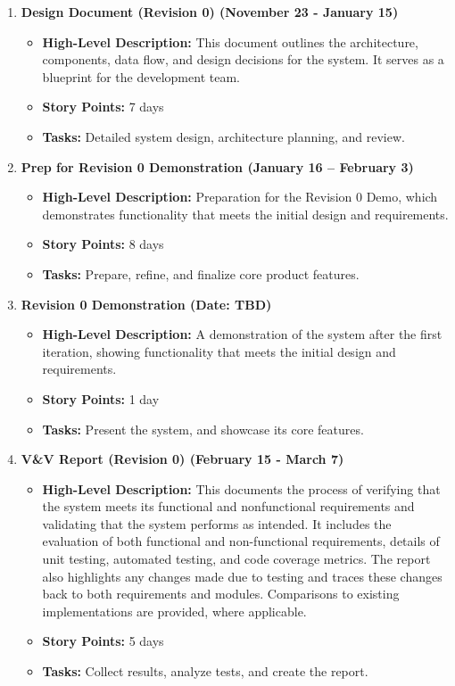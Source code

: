 \documentclass[12pt]{article}
\begin{document}
\begin{enumerate}
    \item \textbf{Design Document (Revision 0) (November 23 - January 15)}
    \begin{itemize}
        \item \textbf{High-Level Description:} This document outlines the architecture, components, data flow, and design decisions for the system. 
        It serves as a blueprint for the development team.
        \item \textbf{Story Points:} 7 days
        \item \textbf{Tasks:} Detailed system design, architecture planning, and review.
    \end{itemize}

    \item \textbf{Prep for Revision 0 Demonstration (January 16 – February 3)}
    \begin{itemize}
        \item \textbf{High-Level Description:} Preparation for the Revision 0 Demo, which demonstrates functionality that meets the initial design and requirements.
        \item \textbf{Story Points:} 8 days
        \item \textbf{Tasks:} Prepare, refine, and finalize core product features.
    \end{itemize}

    \item \textbf{Revision 0 Demonstration (Date: TBD)}
    \begin{itemize}
        \item \textbf{High-Level Description:} A demonstration of the system after the first iteration, showing functionality that meets the initial design and requirements.
        \item \textbf{Story Points:} 1 day
        \item \textbf{Tasks:} Present the system, and showcase its core features.
    \end{itemize}

    \item \textbf{V\&V Report (Revision 0) (February 15 - March 7)}
    \begin{itemize}
        \item \textbf{High-Level Description:} This documents the process of verifying that the system meets its functional and nonfunctional requirements and validating that 
        the system performs as intended. It includes the evaluation of both functional and non-functional requirements, details of unit testing, automated testing, and code 
        coverage metrics. The report also highlights any changes made due to testing and traces these changes back to both requirements and modules. Comparisons to existing 
        implementations are provided, where applicable.
        \item \textbf{Story Points:} 5 days
        \item \textbf{Tasks:} Collect results, analyze tests, and create the report.
    \end{itemize}


\end{enumerate}
\end{document}
